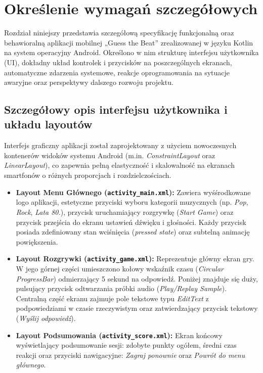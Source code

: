\newpage
\section{Określenie wymagań szczegółowych}		%

\hspace{0.60cm}Rozdział niniejszy przedstawia szczegółową specyfikację funkcjonalną oraz behawioralną aplikacji mobilnej „Guess the Beat” zrealizowanej w języku Kotlin na system operacyjny Android. Określono w nim strukturę interfejsu użytkownika (UI), dokładny układ kontrolek i przycisków na poszczególnych ekranach, automatyczne zdarzenia systemowe, reakcje oprogramowania na sytuacje awaryjne oraz perspektywy dalszego rozwoju projektu.

\subsection{Szczegółowy opis interfejsu użytkownika i układu layoutów}

\hspace{0.60cm}Interfejs graficzny aplikacji został zaprojektowany z użyciem nowoczesnych kontenerów widoków systemu Android (m.in. \textit{ConstraintLayout} oraz \textit{LinearLayout}), co zapewnia pełną elastyczność i skalowalność na ekranach smartfonów o różnych proporcjach i rozdzielczościach. 

\begin{itemize}
    \item \textbf{Layout Menu Głównego (\texttt{activity\_main.xml}):} 
    Zawiera wyśśrodkowane logo aplikacji, estetyczne przyciski wyboru kategorii muzycznych (np. \textit{Pop}, \textit{Rock}, \textit{Lata 80.}), przycisk uruchamiający rozgrywkę (\textit{Start Game}) oraz przycisk przejścia do ekranu ustawień dźwięku i głośności. Każdy przycisk posiada zdefiniowany stan wciśnięcia (\textit{pressed state}) oraz subtelną animację powiększenia.
    
    \item \textbf{Layout Rozgrywki (\texttt{activity\_game.xml}):} 
    Reprezentuje główny ekran gry. W jego górnej części umieszczono kołowy wskaźnik czasu (\textit{Circular ProgressBar}) odmierzający 5 sekund na odpowiedź. Poniżej znajduje się duży, pulsujący przycisk odtwarzania próbki audio (\textit{Play/Replay Sample}). Centralną część ekranu zajmuje pole tekstowe typu \textit{EditText} z podpowiedziami w czasie rzeczywistym oraz zatwierdzający przycisk tekstowy (\textit{Wyślij odpowiedź}).
    
    \item \textbf{Layout Podsumowania (\texttt{activity\_score.xml}):} 
    Ekran końcowy wyświetlający podsumowanie sesji: zdobyte punkty ogółem, średni czas reakcji oraz przyciski nawigacyjne: \textit{Zagraj ponownie} oraz \textit{Powrót do menu głównego}.
\end{itemize}

